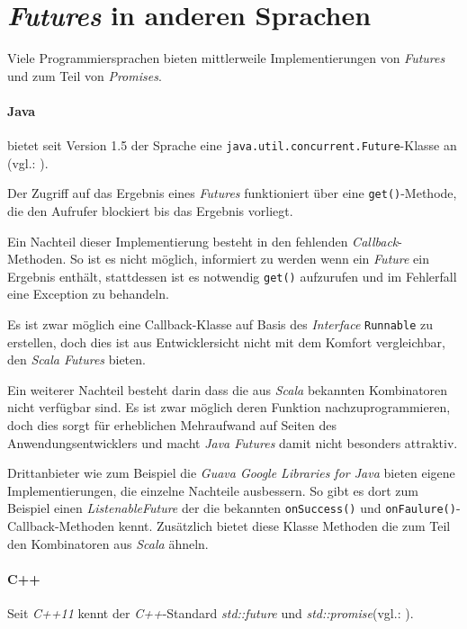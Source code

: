 \section{\emph{Futures} in anderen Sprachen}

Viele Programmiersprachen bieten mittlerweile Implementierungen von
\emph{Futures} und zum Teil von \emph{Promises}.

\paragraph{Java} bietet seit Version 1.5 der Sprache eine 
\texttt{java.util.concurrent.Future}-Klasse an (vgl.: \cite{javadocfuture}).

Der Zugriff auf das Ergebnis eines \emph{Futures} funktioniert über
eine \texttt{get()}-Methode, die den Aufrufer blockiert bis das
Ergebnis vorliegt.

Ein Nachteil dieser Implementierung besteht in den fehlenden
\emph{Callback}-Methoden. So ist es nicht möglich, informiert
zu werden wenn ein \emph{Future} ein Ergebnis enthält, stattdessen
ist es notwendig \texttt{get()} aufzurufen und im Fehlerfall
eine Exception zu behandeln.

Es ist zwar möglich eine Callback-Klasse auf Basis des \emph{Interface}
\texttt{Runnable} zu erstellen, doch dies ist aus Entwicklersicht
nicht mit dem Komfort vergleichbar, den \emph{Scala Futures} bieten.

Ein weiterer Nachteil besteht darin dass die aus \emph{Scala} bekannten
Kombinatoren nicht verfügbar sind. Es ist zwar möglich deren Funktion
nachzuprogrammieren, doch dies sorgt für erheblichen Mehraufwand
auf Seiten des Anwendungsentwicklers und macht \emph{Java Futures}
damit nicht besonders attraktiv.

Drittanbieter wie zum Beispiel die \emph{Guava Google Libraries for Java}
bieten eigene Implementierungen, die einzelne Nachteile ausbessern.
So gibt es dort zum Beispiel einen \emph{ListenableFuture} der die
bekannten \texttt{onSuccess()} und \texttt{onFaulure()}-Callback-Methoden
kennt. Zusätzlich bietet diese Klasse Methoden die zum Teil den
Kombinatoren aus \emph{Scala} ähneln.

\paragraph{C++} Seit \emph{C++11} kennt der \emph{C++}-Standard
\emph{std::future} und \emph{std::promise}(vgl.: \cite{cpp11FAQ}).

